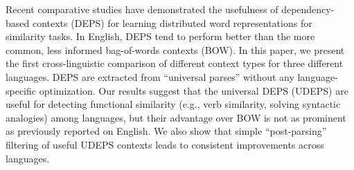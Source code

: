 Recent comparative studies have demonstrated the usefulness of dependency-based contexts (DEPS) for learning distributed word representations for similarity tasks. In English, DEPS tend to perform better than the more common, less informed bag-of-words contexts (BOW). In this paper, we present the first cross-linguistic comparison of different context types for three different languages. DEPS are extracted from ``universal parses'' without any language-specific optimization. Our results suggest that the universal DEPS (UDEPS) are useful for detecting functional similarity (e.g., verb similarity, solving syntactic analogies) among languages, but their advantage over BOW is not as prominent as previously reported on English. We also show that simple ``post-parsing'' filtering of useful UDEPS contexts leads to consistent improvements across languages.
